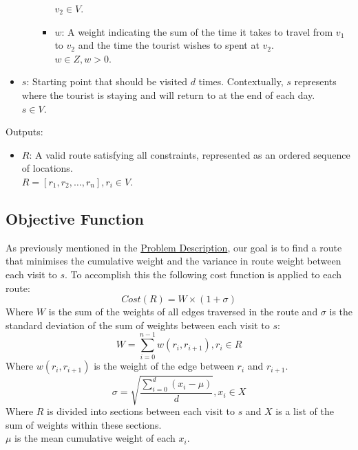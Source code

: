 \begin{itemize}
\begin{itemize}
\begin{itemize}
            $v_2 \in V$.
            \item[\textbullet]$w$: A weight indicating the sum of the time it takes to travel from $v_1$ to $v_2$
            and the time the tourist wishes to spent at $v_2$.\\
            $w \in Z, w > 0$.
        \end{itemize}
    \end{itemize}
    \item $s$: Starting point that should be visited $d$ times.
    Contextually, $s$ represents where the tourist is staying and will return to at the end of each day.\\
    $s \in V$.
\end{itemize}
Outputs:
    \begin{itemize}
    \item $R$: A valid route satisfying all constraints, represented as an ordered sequence of locations.\\
    $R = [r_1, r_2, \dots, r_n], r_i \in V$.
\end{itemize}

\subsection{Objective Function}\label{subsec:objective-function}
As previously mentioned in the \hyperref[subsec:problem-description]{Problem Description}, our goal is to find a
route that minimises the cumulative weight and the variance in route weight between each visit to $s$.
To accomplish this the following cost function is applied to each route:
\begin{equation}
    Cost(R) = W \times (1 + \sigma)\label{eq:cost}
\end{equation}
Where $W$ is the sum of the weights of all edges traversed in the route and $\sigma$ is the standard deviation of the
sum of weights between each visit to $s$:
\begin{equation}
    W = \sum_{i=0}^{n-1} w(r_i, r_{i+1}), r_i \in R\label{eq:weight}
\end{equation}
Where $w(r_i, r_{i+1})$ is the weight of the edge between $r_i$ and $r_{i+1}$.
\begin{equation}
    \sigma = \sqrt{\frac{\sum_{i=0}^{d}(x_i-\mu)}{d}}, x_i \in X\label{eq:standard-deviation}
\end{equation}
Where $R$ is divided into sections between each visit to $s$ and $X$ is a list of the sum of weights within these
sections.\\
$\mu$ is the mean cumulative weight of each $x_i$.

